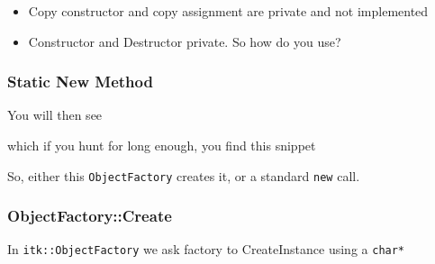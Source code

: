 \begin{itemize}
\itemsep1pt\parskip0pt
\item
  Copy constructor and copy assignment are private and not implemented
\item
  Constructor and Destructor private. So how do you use?
\end{itemize}

\subsubsection{Static New Method}\label{static-new-method}

You will then see

\begin{Shaded}
\begin{Highlighting}[]
\end{Highlighting}
\end{Shaded}

which if you hunt for long enough, you find this snippet

\begin{Shaded}
\begin{Highlighting}[]
   \NormalTok{)                                     }
    \NormalTok{\{}
     
      \NormalTok{\{}
       
      \NormalTok{\}}
     
    \NormalTok{\}}
\end{Highlighting}
\end{Shaded}

So, either this \texttt{ObjectFactory} creates it, or a standard
\texttt{new} call.

\subsubsection{ObjectFactory::Create}\label{objectfactorycreate}

In \texttt{itk::ObjectFactory} we ask factory to CreateInstance using a
\texttt{char*}

\begin{Shaded}
\begin{Highlighting}[]
    
  \NormalTok{\{}
     
  \NormalTok{\}}
\end{Highlighting}
\end{Shaded}

